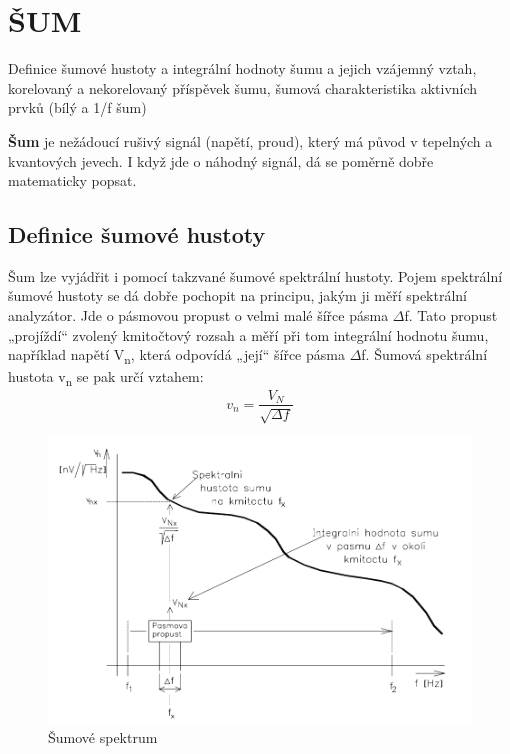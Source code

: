\section{ŠUM}
Definice šumové hustoty a integrální hodnoty šumu a jejich vzájemný vztah, korelovaný a nekorelovaný příspěvek šumu, šumová charakteristika aktivních prvků (bílý a 1/f šum)

\textbf{Šum} je nežádoucí rušivý signál (napětí, proud), který má původ v tepelných a kvantových jevech. I když jde o náhodný signál, dá se poměrně dobře matematicky popsat.

\subsection{Definice šumové hustoty}
Šum lze vyjádřit i pomocí takzvané šumové spektrální hustoty. Pojem spektrální šumové
hustoty se dá dobře pochopit na principu, jakým ji měří spektrální analyzátor. Jde o pásmovou propust o velmi malé šířce pásma $\Delta$f. Tato propust „projíždí“ zvolený kmitočtový rozsah a měří při tom integrální hodnotu šumu, například napětí V\textsubscript{n}, která odpovídá „její“ šířce pásma $\Delta$f. Šumová spektrální hustota v\textsubscript{n} se pak určí vztahem:
\begin{equation}
v_{n} = \frac{V_{N}}{\sqrt{\Delta f}}
\end{equation}

\begin{figure}[h]
   \begin{center}
     \includegraphics[scale=0.5]{images/sum.png}
   \end{center}
   \caption{Šumové spektrum}
\end{figure}

